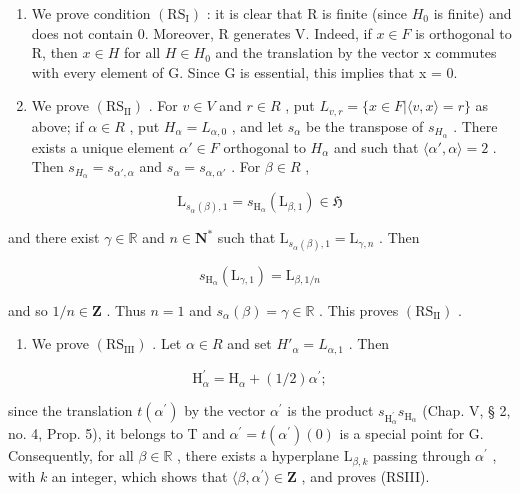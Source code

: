 \begin{enumerate}
\def\labelenumi{\alph{enumi})}
\item
  We prove condition \((\mathrm{RS}_{\mathrm{I}})\) : it is clear that R is finite (since \(H_{0}\) is finite) and does not contain 0. Moreover, R generates V. Indeed, if \(x \in F\) is orthogonal to R, then \(x \in H\) for all \(H \in H_{0}\) and the translation by the vector x commutes with every element of G. Since G is essential, this implies that x = 0.
\item
  We prove \((\mathrm{RS}_{\mathrm{II}})\) . For \(v \in V\) and \(r \in R\) , put \(L_{v,r} = \{x \in F | \langle v, x \rangle = r\}\) as above; if \(\alpha \in R\) , put \(H_{\alpha} = L_{\alpha,0}\) , and let \(s_{\alpha}\) be the transpose of \(s_{H_{\alpha}}\) . There exists a unique element \(\alpha' \in F\) orthogonal to \(H_{\alpha}\) and such that \(\langle \alpha', \alpha \rangle = 2\) . Then \(s_{H_{\alpha}} = s_{\alpha', \alpha}\) and \(s_{\alpha} = s_{\alpha, \alpha'}\) . For \(\beta \in R\) ,
\end{enumerate}

\[
\mathrm{L} _ {s _ {\alpha} (\beta), 1} = s _ {\mathrm{H} _ {\alpha}} \left(\mathrm{L} _ {\beta , 1}\right) \in \mathfrak {H}
\]

and there exist \(\gamma \in \mathbb{R}\) and \(n\in \mathbf{N}^*\) such that \(\mathrm{L}_{s_{\alpha}(\beta),1} = \mathrm{L}_{\gamma ,n}\) . Then

\[
s _ {\mathrm{H} _ {\alpha}} (\mathrm{L} _ {\gamma , 1}) = \mathrm{L} _ {\beta , 1 / n}
\]

and so \(1 / n\in \mathbf{Z}\) . Thus \(n = 1\) and \(s_{\alpha}(\beta) = \gamma \in \mathbb{R}\) . This proves \((\mathrm{RS}_{\mathrm{II}})\) .

\begin{enumerate}
\def\labelenumi{\alph{enumi})}
\setcounter{enumi}{2}
\tightlist
\item
  We prove \((\mathrm{RS}_{\mathrm{III}})\) . Let \(\alpha \in R\) and set \(H'_{\alpha} = L_{\alpha,1}\) . Then
\end{enumerate}

\[
\mathrm{H} _ {\alpha} ^ {\prime} = \mathrm{H} _ {\alpha} + (1 / 2) \alpha^ {\prime};
\]

since the translation \(t(\alpha^{\prime})\) by the vector \(\alpha^{\prime}\) is the product \(s_{\mathrm{H}_{\alpha}^{\prime}}s_{\mathrm{H}_{\alpha}}\) (Chap. V, § 2, no. 4, Prop. 5), it belongs to T and \(\alpha^{\prime} = t(\alpha^{\prime})(0)\) is a special point for G. Consequently, for all \(\beta \in \mathbb{R}\) , there exists a hyperplane \(\mathrm{L}_{\beta,k}\) passing through \(\alpha^{\prime}\) , with \(k\) an integer, which shows that \(\langle \beta ,\alpha^{\prime}\rangle \in \mathbf{Z}\) , and proves (RSIII).

